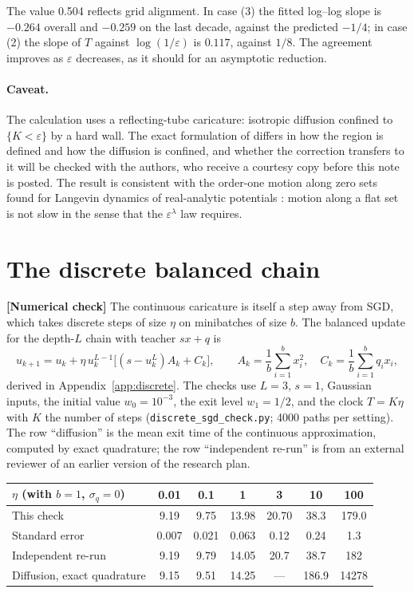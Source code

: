 \documentclass[11pt,a4paper]{article}
\newcommand{\eps}{\varepsilon}
\newcommand{\evl}[2]{{\small\bfseries\color{#1}[#2]}}
\newcommand{\LNum}{\evl{cnum}{Numerical check}}
\begin{document}
\noindent The value 0.504 reflects grid alignment. In case (3) the fitted
log--log slope is $-0.264$ overall and $-0.259$ on the last decade, against
the predicted $-1/4$; in case (2) the slope of $T$ against $\log(1/\eps)$
is $0.117$, against $1/8$. The agreement improves as $\eps$ decreases, as
it should for an asymptotic reduction.

\paragraph{Caveat.} The calculation uses a reflecting-tube caricature:
isotropic diffusion confined to $\{K<\eps\}$ by a hard wall. The exact
formulation of \cite{hennick2026} differs in how the region is defined and
how the diffusion is confined, and whether the correction transfers to it
will be checked with the authors, who receive a courtesy copy before this
note is posted. The result is consistent with the order-one motion along
zero sets found for Langevin dynamics of real-analytic potentials
\cite{larsson2026}: motion along a flat set is not slow in the sense that
the $\eps^\lambda$ law requires.

\section{The discrete balanced chain}
\label{sec:discrete}

\LNum{} The continuous caricature is itself a step away from SGD, which
takes discrete steps of size $\eta$ on minibatches of size $b$. The
balanced update for the depth-$L$ chain with teacher $sx+q$ is
\begin{equation}
u_{k+1}=u_k+\eta\,u_k^{L-1}\bigl[(s-u_k^L)A_k+C_k\bigr],\qquad
A_k=\frac1b\sum_{i=1}^b x_i^2,\quad C_k=\frac1b\sum_{i=1}^b q_ix_i,
\label{eq:update}
\end{equation}
derived in Appendix~\ref{app:discrete}. The checks use $L=3$, $s=1$,
Gaussian inputs, the initial value $w_0=10^{-3}$, the exit level
$w_1=1/2$, and the clock $T=K\eta$ with $K$ the number of steps
(\texttt{discrete\_sgd\_check.py}; 4000 paths per setting). The row
``diffusion'' is the mean exit time of the continuous approximation,
computed by exact quadrature; the row ``independent re-run'' is from an
external reviewer of an earlier version of the research plan.

\begin{center}\small
\begin{tabular}{@{}lcccccc@{}}
\toprule
$\eta$ (with $b=1$, $\sigma_q=0$) & 0.01 & 0.1 & 1 & 3 & 10 & 100 \\
\midrule
This check & 9.19 & 9.75 & 13.98 & 20.70 & 38.3 & 179.0 \\
Standard error & 0.007 & 0.021 & 0.063 & 0.12 & 0.24 & 1.3 \\
Independent re-run & 9.19 & 9.79 & 14.05 & 20.7 & 38.7 & 182 \\
Diffusion, exact quadrature & 9.15 & 9.51 & 14.25 & --- & 186.9 & 14278 \\
\bottomrule
\end{tabular}
\end{center}
\end{document}
